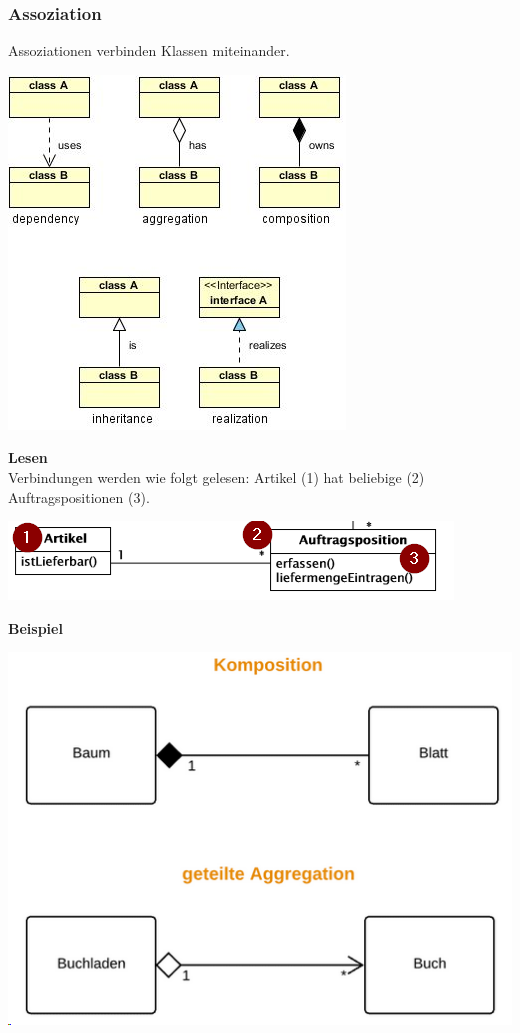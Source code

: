 \subsubsection{Assoziation}
Assoziationen verbinden Klassen miteinander.
\begin{center}
	\includegraphics[width=0.6\columnwidth]{Images/assoziation}
\end{center}


\textbf{Lesen}\\
Verbindungen werden wie folgt gelesen:
Artikel (1) hat beliebige (2) Auftragspositionen (3).\\
\begin{center}
	\includegraphics[width=0.8\columnwidth]{Images/lesen}
\end{center}

\textbf{Beispiel}\\
\begin{center}
	\includegraphics[width=0.6\columnwidth]{Images/assoziation2}
\end{center}

